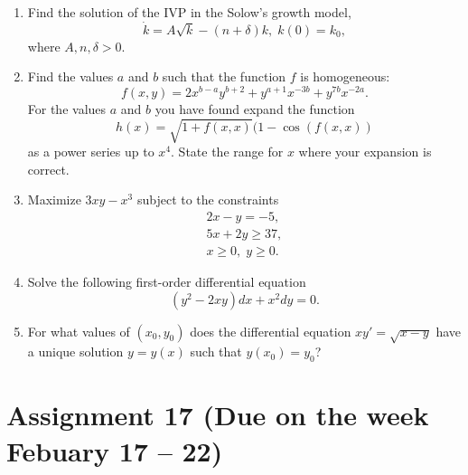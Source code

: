 \documentclass[12pt]{article} %
\theoremstyle{definition} %
\begin{document}
\begin{enumerate}
\item Find the solution of the IVP in the Solow's growth model, 
\[
	\dot k=A\sqrt{k}-(n+\delta)k, \; k(0)=k_0,
\]
where $A,n,\delta>0$.

\item Find the values $a$ and $b$ such that the function $f$ is homogeneous:
\[
	f(x,y)=2x^{b-a}y^{b+2}+y^{a+1}x^{-3b}+y^{7b}x^{-2a}.
\]
For the values $a$ and $b$ you have found expand the function 
\[
	h(x)=\sqrt{1+f(x,x)}(1-\cos(f(x,x))
\]
as a power series up to $x^4$. State the range for $x$ where your expansion is correct.

\item Maximize $3xy-x^3$ subject to the constraints
\[
\begin{array}{l}
2x-y=-5,\\
5x+2y\geqslant 37,\\
x\geqslant 0,\; y\geqslant 0.
\end{array}
\]
\item Solve the following first-order differential equation 
\[
(y^2-2xy)dx+x^2dy=0.
\]
\item For what values of $(x_0,y_0)$ does the differential equation $xy'=\sqrt{x-y}$ 
have a unique solution $y=y(x)$ such that $y(x_0)=y_0$?
\end{enumerate}





\section{Assignment 17 (Due on the week Febuary 17 – 22)}
\end{document}
